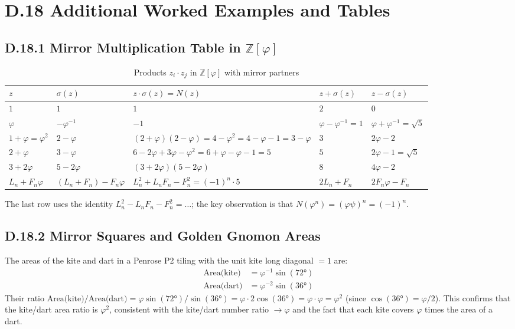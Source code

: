 \section*{D.18  Additional Worked Examples and Tables}

\subsection*{D.18.1  Mirror Multiplication Table in $\mathbb{Z}[\varphi]$}

\begin{table}[h]
\centering
\caption{Products $z_i \cdot z_j$ in $\mathbb{Z}[\varphi]$ with mirror partners}
\begin{tabular}{lllll}
\toprule
$z$ & $\sigma(z)$ & $z \cdot \sigma(z) = N(z)$ & $z + \sigma(z)$ & $z - \sigma(z)$ \\
\midrule
$1$ & $1$ & $1$ & $2$ & $0$ \\
$\varphi$ & $-\varphi^{-1}$ & $-1$ & $\varphi-\varphi^{-1}=1$ & $\varphi+\varphi^{-1}=\sqrt5$ \\
$1+\varphi=\varphi^2$ & $2-\varphi$ & $(2+\varphi)(2-\varphi)=4-\varphi^2=4-\varphi-1=3-\varphi$ & $3$ & $2\varphi-2$ \\
$2+\varphi$ & $3-\varphi$ & $6-2\varphi+3\varphi-\varphi^2=6+\varphi-\varphi-1=5$ & $5$ & $2\varphi-1=\sqrt5$ \\
$3+2\varphi$ & $5-2\varphi$ & $(3+2\varphi)(5-2\varphi)$ & $8$ & $4\varphi-2$ \\
$L_n + F_n\varphi$ & $(L_n+F_n)-F_n\varphi$ & $L_n^2+L_n F_n - F_n^2 = (-1)^n\cdot 5$ & $2L_n+F_n$ & $2F_n\varphi-F_n$ \\
\bottomrule
\end{tabular}
\end{table}

The last row uses the identity $L_n^2 - L_n F_n - F_n^2 = \ldots$; the
key observation is that $N(\varphi^n) = (\varphi\psi)^n = (-1)^n$.

\subsection*{D.18.2  Mirror Squares and Golden Gnomon Areas}

The areas of the kite and dart in a Penrose P2 tiling with the unit kite
long diagonal $= 1$ are:
\begin{align*}
  \text{Area(kite)} &= \varphi^{-1}\sin(72°) \\
  \text{Area(dart)} &= \varphi^{-2}\sin(36°)
\end{align*}
Their ratio $\text{Area(kite)}/\text{Area(dart)} = \varphi\sin(72°)/\sin(36°)
= \varphi \cdot 2\cos(36°) = \varphi \cdot \varphi = \varphi^2$
(since $\cos(36°) = \varphi/2$).
This confirms that the kite/dart area ratio is $\varphi^2$, consistent with
the kite/dart number ratio $\to \varphi$ and the fact that each kite covers
$\varphi$ times the area of a dart.


